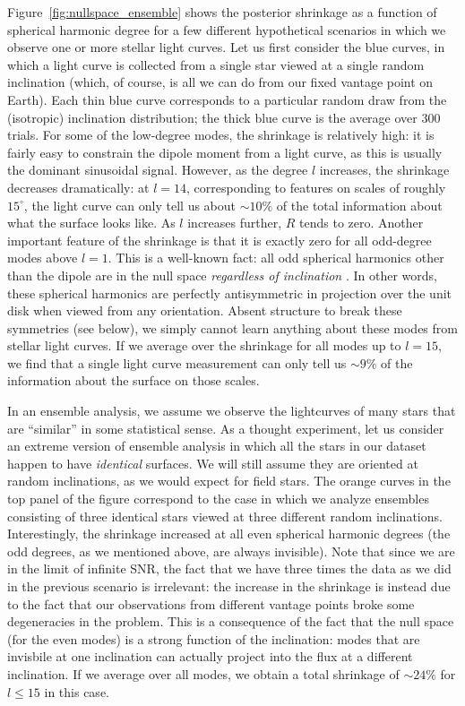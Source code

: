 \documentclass[modern]{aastex62}
\begin{document}
Figure~\ref{fig:nullspace_ensemble} shows the posterior shrinkage
as a function of spherical harmonic degree for a few different hypothetical
scenarios in which we observe one or more stellar light curves.
Let us first consider the blue curves, in which a light curve is
collected from a single star viewed at a single random inclination (which, of course, is
all we can do from our fixed vantage point on Earth).
Each thin blue curve corresponds to a particular random draw from the (isotropic)
inclination distribution; the thick blue curve is the average over 300 trials.
For some of the low-degree modes, the shrinkage is relatively high: it is
fairly easy to constrain the dipole moment from a light curve, as this is
usually the dominant sinusoidal signal. However, as the degree $l$
increases, the shrinkage decreases dramatically: at $l = 14$, corresponding
to features on scales of roughly $15^\circ$, the light curve
can only tell us about $\sim 10\%$ of the total information about what the
surface looks like. As $l$ increases further, $R$ tends to zero.
Another important feature of the shrinkage is that it is exactly zero for
all odd-degree modes above $l = 1$. This is a well-known fact: all odd spherical
harmonics other than the dipole are in the null space \emph{regardless of
    inclination} \citep[e.g.,][]{Luger2019}. In other words, these spherical
harmonics are perfectly antisymmetric in projection over the unit disk
when viewed from any orientation. Absent structure to break these symmetries
(see below), we simply cannot learn anything about these modes from
stellar light curves. If we average over the shrinkage for all modes up to $l=15$,
we find that a single light curve measurement can only tell us $\sim 9\%$
of the information about the surface on those scales.

In an ensemble analysis, we assume we observe the lightcurves of many stars
that are ``similar'' in some statistical sense. As a thought experiment,
let us consider an extreme version of ensemble analysis in which all the
stars in our dataset happen to have \emph{identical} surfaces. We will
still assume they are oriented at random inclinations, as we would expect for
field stars. The orange curves in the top panel of the figure correspond to
the case in which we analyze ensembles consisting of three identical stars
viewed at three different random inclinations.
Interestingly, the shrinkage increased at all even spherical harmonic degrees
(the odd degrees, as we mentioned above, are always invisible).
Note that since we are in the limit of infinite SNR, the fact that we have
three times the data as we did in the previous scenario is irrelevant: the
increase in the shrinkage is instead due to the fact that our observations
from different vantage points broke some degeneracies in the problem.
This is a consequence of the fact that the null space (for the even modes)
is a strong function of the inclination: modes that are invisbile
at one inclination can actually project into the flux at a different inclination.
If we average over all modes, we obtain a total shrinkage of $\sim 24\%$
for $l\leq15$ in this case.
\end{document}
